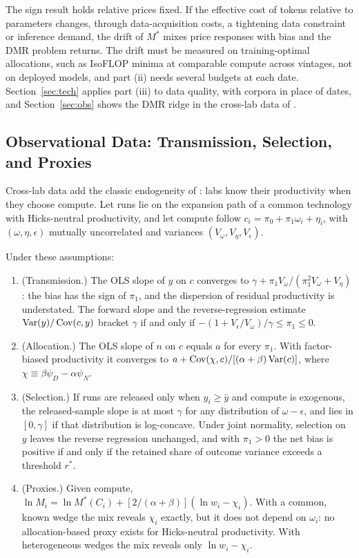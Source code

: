 The sign result holds relative prices fixed. If the effective cost of tokens relative to parameters changes, through
data-acquisition costs, a tightening data constraint or inference demand, the drift of $M^*$ mixes price responses with
bias and the DMR problem returns. The drift must be measured on training-optimal allocations, such as IsoFLOP minima at
comparable compute across vintages, not on deployed models, and part (ii) needs several budgets at each date. Section~\ref{sec:tech} applies part (iii) to data quality, with corpora in place of dates, and
Section~\ref{sec:obs} shows the DMR ridge in the cross-lab data of \citet{ho2024algorithmic}.

\subsection{Observational Data: Transmission, Selection, and Proxies}\label{sec:ident-obs}

Cross-lab data add the classic endogeneity of \citet{marschak1944random}: labs know their productivity when they choose
compute. Let runs lie on the expansion path of a common technology with Hicks-neutral productivity, and let compute follow
$c_i=\pi_0+\pi_1\omega_i+\eta_i$, with $(\omega,\eta,\epsilon)$ mutually uncorrelated and variances
$(V_\omega,V_\eta,V_\epsilon)$.

\begin{proposition}\label{prop:transmission}
Under these assumptions:
\begin{enumerate}
\item[(i)] (Transmission.) The OLS slope of $y$ on $c$ converges to $\gamma+\pi_1V_\omega/(\pi_1^2V_\omega+V_\eta)$: the
bias has the sign of $\pi_1$, and the dispersion of residual productivity is understated. The forward slope and the
reverse-regression estimate $\operatorname{Var}(y)/\operatorname{Cov}(c,y)$ bracket $\gamma$ if and only if
$-(1+V_\epsilon/V_\omega)/\gamma\le\pi_1\le0$.
\item[(ii)] (Allocation.) The OLS slope of $n$ on $c$ equals $a$ for every $\pi_1$. With factor-biased productivity it
converges to $a+\operatorname{Cov}(\chi,c)/[(\alpha+\beta)\operatorname{Var}(c)]$, where $\chi\equiv\beta\psi_D-\alpha\psi_N$.
\item[(iii)] (Selection.) If runs are released only when $y_i\ge\bar y$ and compute is exogenous, the released-sample
slope is at most $\gamma$ for any distribution of $\omega-\epsilon$, and lies in $[0,\gamma]$ if that distribution is
log-concave. Under joint normality, selection on $y$ leaves the reverse regression unchanged, and with $\pi_1>0$ the net
bias is positive if and only if the retained share of outcome variance exceeds a threshold $r^*$.
\item[(iv)] (Proxies.) Given compute, $\ln M_i=\ln M^*(C_i)+[2/(\alpha+\beta)](\ln w_i-\chi_i)$. With a common, known
wedge the mix reveals $\chi_i$ exactly, but it does not depend on $\omega_i$: no allocation-based proxy exists for
Hicks-neutral productivity. With heterogeneous wedges the mix reveals only $\ln w_i-\chi_i$.
\end{enumerate}
\end{proposition}


